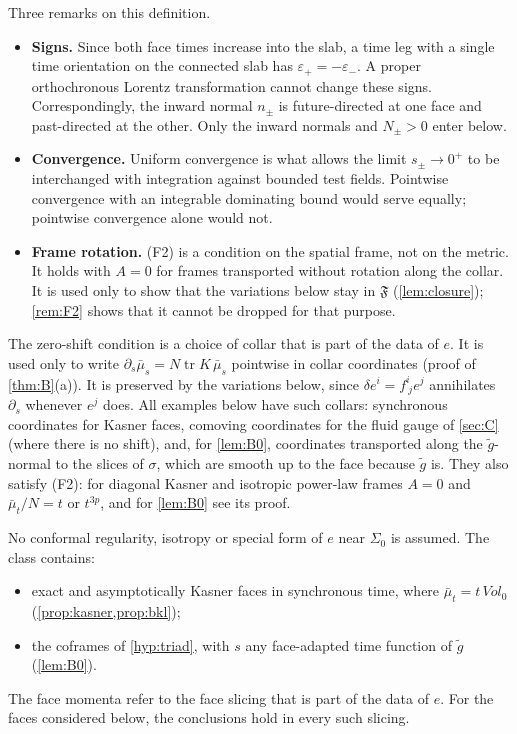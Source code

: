 \documentclass[11pt]{article}
\theoremstyle{canonmath}
\theoremstyle{canonpostulate}
\theoremstyle{canonproposition}
\theoremstyle{canonmath}
\theoremstyle{canonproposition}
\providecommand{\Fcl}{\mathfrak{F}}
\def\mathrm#1{#1}%
\begin{document}
Three remarks on this definition.
\begin{itemize}
\item \textbf{Signs.} Since both face times increase into the slab, a time leg with a single time orientation on the connected slab has $\varepsilon_+ = -\varepsilon_-$. A proper orthochronous Lorentz transformation cannot change these signs. Correspondingly, the inward normal $n_\pm$ is future-directed at one face and past-directed at the other. Only the inward normals and $N_\pm>0$ enter below.
\item \textbf{Convergence.} Uniform convergence is what allows the limit $s_\pm\to0^+$ to be interchanged with integration against bounded test fields. Pointwise convergence with an integrable dominating bound would serve equally; pointwise convergence alone would not.
\item \textbf{Frame rotation.} (F2) is a condition on the spatial frame, not on the metric. It holds with $A = 0$ for frames transported without rotation along the collar. It is used only to show that the variations below stay in $\Fcl$ (\cref{lem:closure}); \cref{rem:F2} shows that it cannot be dropped for that purpose.
\end{itemize}

The zero-shift condition is a choice of collar that is part of the data of $e$. It is used only to write $\partial_s\bar\mu_s = N\operatorname{tr}K\,\bar\mu_s$ pointwise in collar coordinates (proof of \cref{thm:B}(a)). It is preserved by the variations below, since $\delta e^i = f^i_{\ j}e^j$ annihilates $\partial_s$ whenever $e^j$ does. All examples below have such collars: synchronous coordinates for Kasner faces, comoving coordinates for the fluid gauge of \cref{sec:C} (where there is no shift), and, for \cref{lem:B0}, coordinates transported along the $\tilde g$-normal to the slices of $\sigma$, which are smooth up to the face because $\tilde g$ is. They also satisfy (F2): for diagonal Kasner and isotropic power-law frames $A = 0$ and $\bar\mu_t/N = t$ or $t^{3p}$, and for \cref{lem:B0} see its proof.

No conformal regularity, isotropy or special form of $e$ near $\Sigma_0$ is assumed. The class contains:
\begin{itemize}
\item exact and asymptotically Kasner faces in synchronous time, where $\bar\mu_t = t\,\mathrm{Vol}_0$ (\cref{prop:kasner,prop:bkl});
\item the coframes of \ref{hyp:triad}, with $s$ any face-adapted time function of $\tilde g$ (\cref{lem:B0}).
\end{itemize}
The face momenta refer to the face slicing that is part of the data of $e$. For the faces considered below, the conclusions hold in every such slicing.
\end{document}
